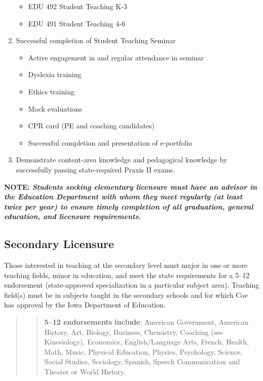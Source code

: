 \documentclass[
  letterpaper,
]{scrbook}
\providecommand{\tightlist}{%
  \setlength{\itemsep}{0pt}\setlength{\parskip}{0pt}}
\begin{document}
\begin{enumerate}
  \begin{itemize}
  \tightlist
  \item
    EDU 492 Student Teaching K-3
  \item
    EDU 491 Student Teaching 4-6
  \end{itemize}
\item
  Successful completion of Student Teaching Seminar

  \begin{itemize}
  \tightlist
  \item
    Active engagement in and regular attendance in seminar
  \item
    Dyslexia training
  \item
    Ethics training
  \item
    Mock evaluations
  \item
    CPR card (PE and coaching candidates)
  \item
    Successful completion and presentation of e-portfolio
  \end{itemize}
\item
  Demonstrate content-area knowledge and pedagogical knowledge by
  successfully passing state-required Praxis II exams.
\end{enumerate}

\textbf{NOTE:} \textbf{\emph{Students seeking elementary licensure must
have an advisor in the Education Department with whom they meet
regularly (at least twice per year) to ensure timely completion of all
graduation, general education, and licensure requirements.}}

\subsection{Secondary Licensure}\label{secondary-licensure}

Those interested in teaching at the secondary level must major in one or
more teaching fields, minor in education, and meet the state
requirements for a 5--12 endorsement (state-approved specialization in a
particular subject area). Teaching field(s) must be in subjects taught
in the secondary schools and for which Coe has approval by the Iowa
Department of Education.

\begin{quote}
\begin{quote}
\textbf{5--12 endorsements include}: American Government, American
History, Art, Biology, Business, Chemistry, Coaching (see Kinesiology),
Economics, English/Language Arts, French, Health, Math, Music, Physical
Education, Physics, Psychology, Science, Social Studies, Sociology,
Spanish, Speech Communication and Theater or World History.
\end{quote}
\end{quote}
\end{document}
